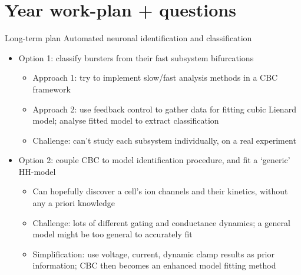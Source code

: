 \documentclass[presentation]{beamer}
\begin{document}
\section{Year work-plan + questions}
\label{sec:orgbf57850}
\begin{frame}[label={sec:org707089f}]{Long-term plan}
Automated neuronal identification and classification
\vfill
\begin{itemize}
\item Option 1: classify bursters from their fast subsystem bifurcations
\begin{itemize}
\item Approach 1: try to implement slow/fast analysis methods in a CBC framework
\item Approach 2: use feedback control to gather data for fitting cubic Lienard model; analyse fitted model to extract classification
\item Challenge: can't study each subsystem individually, on a real experiment
\end{itemize}
\item Option 2: couple CBC to model identification procedure, and fit a `generic' HH-model
\begin{itemize}
\item Can hopefully discover a cell's ion channels and their kinetics, without any a priori knowledge
\item Challenge: lots of different gating and conductance dynamics; a general model might be too general to accurately fit
\item Simplification: use voltage, current, dynamic clamp results as prior information; CBC then becomes an enhanced model fitting method
\end{itemize}
\end{itemize}
\end{frame}
\end{document}
